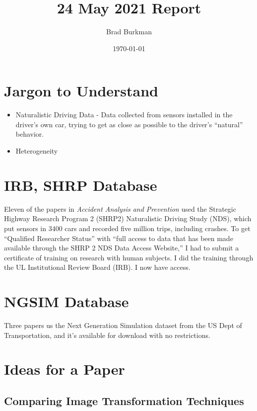 \documentclass[11pt]{article}
\title{24 May 2021 Report}
\author{Brad Burkman}
\date{\today}
\begin{document}
\setlength{\parindent}{20pt}
\begin{spacing}{1.2}
\maketitle
\tableofcontents

\section{Jargon to Understand}

\begin{itemize}
	\item Naturalistic Driving Data - Data collected from sensors installed in the driver's own car, trying to get as close as possible to the driver's ``natural'' behavior.
	\item Heterogeneity
\end{itemize}

\section{IRB, SHRP Database}

Eleven of the papers in {\it Accident Analysis and Prevention} used the Strategic Highway Research Program 2 (SHRP2) Naturalistic Driving Study (NDS), which put sensors in 3400 cars and recorded five million trips, including crashes.  To get ``Qualified Researcher Status'' with ``full access to data that has been made available through the SHRP 2 NDS Data Access Website,'' I had to submit a certificate of training on research with human subjects.  I did the training through the UL Institutional Review Board (IRB). I now have access.  

\section{NGSIM Database}

Three papers us the Next Generation Simulation dataset from the US Dept of Transportation, and it's available for download with no restrictions.  

\section{Ideas for a Paper}

\subsection{Comparing Image Transformation Techniques}


\end{spacing}
\end{document}
